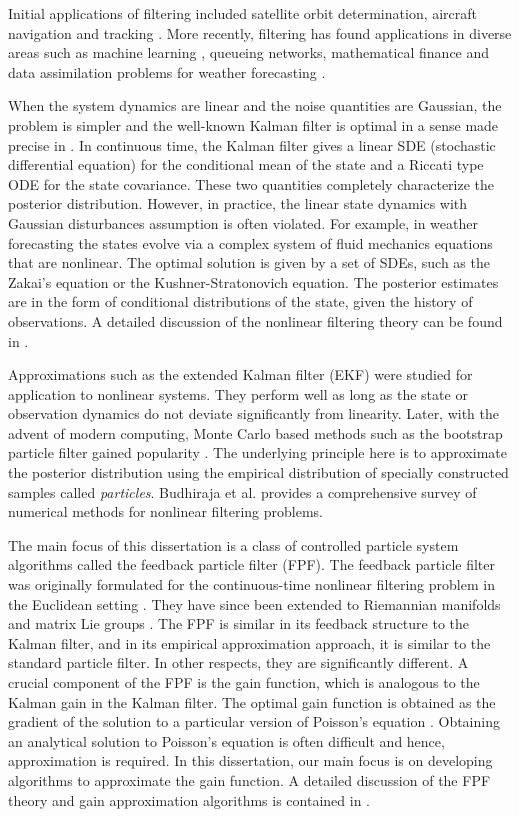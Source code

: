Initial applications of filtering included satellite orbit determination, aircraft navigation and tracking \cite{kutsurpfi19}. More recently, filtering has found applications in diverse areas such as machine learning \cite{bishop06}, queueing networks, mathematical finance \cite{brihan08} and data assimilation problems for weather forecasting \cite{eve94}.

When the system dynamics are linear and the noise quantities are Gaussian, the problem is simpler and the well-known Kalman filter is optimal in a sense made precise in . In continuous time, the Kalman filter gives a linear SDE (stochastic differential equation) for the conditional mean of the state and a Riccati type ODE for the state covariance. These two quantities completely characterize the posterior distribution. However, in practice, the linear state dynamics with Gaussian disturbances assumption is often violated.  For example, in weather forecasting the states evolve via a complex system of fluid mechanics equations that are nonlinear. The optimal solution is given by a set of SDEs, such as the Zakai's equation or the Kushner-Stratonovich equation. The posterior estimates are in the form of conditional distributions of the state, given the history of observations. A detailed discussion of the nonlinear filtering theory can be found in \cite{baicri08}. 

Approximations such as the extended Kalman filter (EKF) were studied for application to nonlinear systems. They perform well as long as the state or observation dynamics do not deviate significantly from linearity. Later, with the advent of modern computing, Monte Carlo based methods such as the bootstrap particle filter gained popularity \cite{}. The underlying principle here is to approximate the posterior distribution using the empirical distribution of specially constructed samples called \emph{particles}. Budhiraja et al. \cite{budchelee07} provides a comprehensive survey of numerical methods for nonlinear filtering problems. 

The main focus of this dissertation is a class of controlled particle system algorithms called the feedback particle filter (FPF). The feedback particle filter was originally formulated for the continuous-time nonlinear filtering problem in the Euclidean setting \cite{yanmehmey13}. They have since been extended to Riemannian manifolds and matrix Lie groups \cite{zhatagmeh16}. The FPF is similar in its feedback structure to the Kalman filter, and in its empirical approximation approach, it is similar to the standard particle filter. In other respects, they are significantly different. A crucial component of the FPF is the gain function, which is analogous to the Kalman gain in the Kalman filter. The optimal gain function is obtained as the gradient of the solution to a particular version of Poisson's equation \cite{yanmehmey13, laumehmeyrag14}. Obtaining an analytical solution to Poisson's equation is often difficult and hence, approximation is required. In this dissertation, our main focus is on developing algorithms to approximate the gain function. A detailed discussion of the FPF theory and gain approximation algorithms is contained in . 


